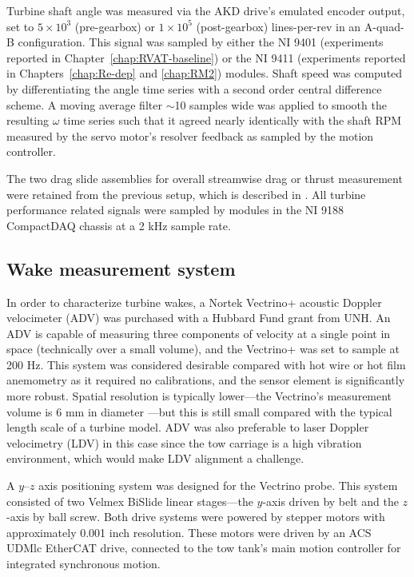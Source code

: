 Turbine shaft angle was measured via the AKD drive's emulated encoder output,
set to $5 \times 10^3$ (pre-gearbox) or $1 \times 10^5$ (post-gearbox)
lines-per-rev in an A-quad-B configuration. This signal was sampled by either
the NI 9401 (experiments reported in Chapter~\ref{chap:RVAT-baseline}) or the NI
9411 (experiments reported in Chapters~\ref{chap:Re-dep} and \ref{chap:RM2})
modules. Shaft speed was computed by differentiating the angle time series with
a second order central difference scheme. A moving average filter $\sim$10
samples wide was applied to smooth the resulting $\omega$ time series such that
it agreed nearly identically with the shaft RPM measured by the servo motor's
resolver feedback as sampled by the motion controller.

The two drag slide assemblies for overall streamwise drag or thrust measurement
were retained from the previous setup, which is described in
\cite{Bachant2011-MS}. All turbine performance related signals were sampled by
modules in the NI 9188 CompactDAQ chassis at a 2 kHz sample rate.


\subsection{Wake measurement system}

In order to characterize turbine wakes, a Nortek Vectrino+ acoustic Doppler
velocimeter (ADV) was purchased with a Hubbard Fund grant from UNH. An ADV is
capable of measuring three components of velocity at a single point in space
(technically over a small volume), and the Vectrino+ was set to sample at 200
Hz. This system was considered desirable compared with hot wire or hot film
anemometry as it required no calibrations, and the sensor element is
significantly more robust. Spatial resolution is typically lower---the
Vectrino's measurement volume is 6 mm in diameter \cite{NortekVectrino}---but
this is still small compared with the typical length scale of a turbine model.
ADV was also preferable to laser Doppler velocimetry (LDV) in this case since
the tow carriage is a high vibration environment, which would make LDV alignment
a challenge.

A $y$--$z$ axis positioning system was designed for the Vectrino probe. This
system consisted of two Velmex BiSlide linear stages---the $y$-axis driven by
belt and the $z$-axis by ball screw. Both drive systems were powered by stepper
motors with approximately 0.001 inch resolution. These motors were driven by an
ACS UDMlc EtherCAT drive, connected to the tow tank's main motion controller for
integrated synchronous motion.

